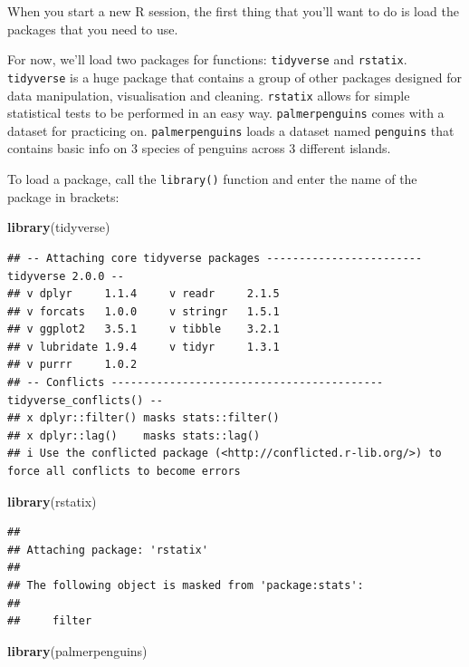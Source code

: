 \documentclass[
]{book}
\newenvironment{Shaded}{\begin{snugshade}}{\end{snugshade}}
\newcommand{\FunctionTok}[1]{\textcolor[rgb]{0.13,0.29,0.53}{\textbf{#1}}}
\newcommand{\NormalTok}[1]{#1}
\begin{document}
When you start a new R session, the first thing that you'll want to do is load the packages that you need to use.

For now, we'll load two packages for functions: \texttt{tidyverse} and \texttt{rstatix}. \texttt{tidyverse} is a huge package that contains a group of other packages designed for data manipulation, visualisation and cleaning. \texttt{rstatix} allows for simple statistical tests to be performed in an easy way. \texttt{palmerpenguins} comes with a dataset for practicing on. \texttt{palmerpenguins} loads a dataset named \texttt{penguins} that contains basic info on 3 species of penguins across 3 different islands.

To load a package, call the \texttt{library()} function and enter the name of the package in brackets:

\begin{Shaded}
\begin{Highlighting}[]
\FunctionTok{library}\NormalTok{(tidyverse)}
\end{Highlighting}
\end{Shaded}

\begin{verbatim}
## -- Attaching core tidyverse packages ------------------------ tidyverse 2.0.0 --
## v dplyr     1.1.4     v readr     2.1.5
## v forcats   1.0.0     v stringr   1.5.1
## v ggplot2   3.5.1     v tibble    3.2.1
## v lubridate 1.9.4     v tidyr     1.3.1
## v purrr     1.0.2     
## -- Conflicts ------------------------------------------ tidyverse_conflicts() --
## x dplyr::filter() masks stats::filter()
## x dplyr::lag()    masks stats::lag()
## i Use the conflicted package (<http://conflicted.r-lib.org/>) to force all conflicts to become errors
\end{verbatim}

\begin{Shaded}
\begin{Highlighting}[]
\FunctionTok{library}\NormalTok{(rstatix)}
\end{Highlighting}
\end{Shaded}

\begin{verbatim}
## 
## Attaching package: 'rstatix'
## 
## The following object is masked from 'package:stats':
## 
##     filter
\end{verbatim}

\begin{Shaded}
\begin{Highlighting}[]
\FunctionTok{library}\NormalTok{(palmerpenguins)}
\end{Highlighting}
\end{Shaded}
\end{document}
